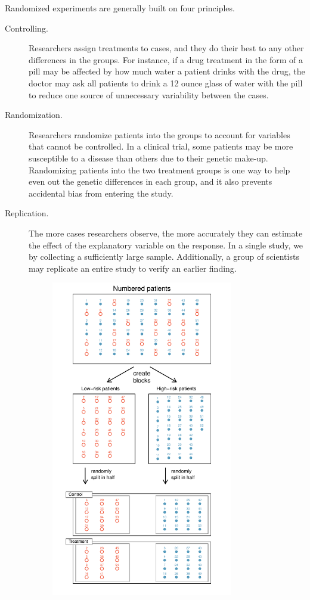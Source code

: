Randomized experiments are generally built on four principles.
\begin{description}
\item[Controlling.] Researchers assign treatments to cases, and they do their best to  any other differences in the groups. For instance, if a drug treatment in the form of a pill may be affected by how much water a patient drinks with the drug, the doctor may ask all patients to drink a 12 ounce glass of water with the pill to reduce one source of unnecessary variability between the cases.
\item[Randomization.] Researchers randomize patients into the groups to account for variables that cannot be controlled. In a clinical trial, some patients may be more susceptible to a disease than others due to their genetic make-up. Randomizing patients into the two treatment groups is one way to help even out the genetic differences in each group, and it also prevents accidental bias from entering the study.
\item[Replication.] The more cases researchers observe, the more accurately they can estimate the effect of the explanatory variable on the response. In a single study, we  by collecting a sufficiently large sample. Additionally, a group of scientists may replicate an entire study to verify an earlier finding.
\begin{figure}
\centering
\includegraphics[width=0.78\textwidth]{01/figures/figureShowingBlocking/figureShowingBlocking}

\end{figure}
\end{description}
